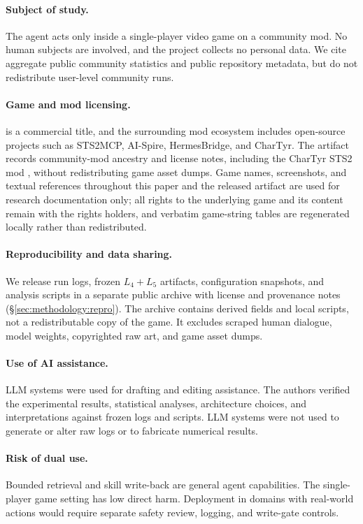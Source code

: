 
\paragraph{Subject of study.}
The agent acts only inside a single-player video game on a community
mod. No human subjects are involved, and the project collects no
personal data. We cite aggregate public community statistics and
public repository metadata, but do not redistribute user-level
community runs.

\paragraph{Game and mod licensing.}
\stspad{} is a commercial title, and the surrounding mod ecosystem
includes open-source projects such as STS2MCP, AI-Spire,
HermesBridge, and CharTyr. The artifact records community-mod
ancestry and license notes, including the CharTyr STS2 mod
\citep{chartyr-sts2-2026}, without redistributing game asset dumps.
Game names, screenshots, and textual references throughout this paper
and the released artifact are used for research documentation only;
all rights to the underlying game and its content remain with the
rights holders, and verbatim game-string tables are regenerated locally
rather than redistributed.

\paragraph{Reproducibility and data sharing.}
We release run logs, frozen $L_4{+}L_5$ artifacts, configuration
snapshots, and analysis scripts in a separate public archive with
license and provenance notes (\S\ref{sec:methodology:repro}). The
archive contains derived fields and local scripts, not a
redistributable copy of the game. It excludes scraped human dialogue,
model weights, copyrighted raw art, and game asset dumps.

\paragraph{Use of AI assistance.}
LLM systems were used for drafting and editing assistance. The
authors verified the experimental results, statistical analyses,
architecture choices, and interpretations against frozen logs and
scripts. LLM systems were not used to generate or alter raw logs or
to fabricate numerical results.

\paragraph{Risk of dual use.}
Bounded retrieval and skill write-back are general agent capabilities.
The single-player game setting has low direct harm. Deployment in
domains with real-world actions would require separate safety review,
logging, and write-gate controls.
